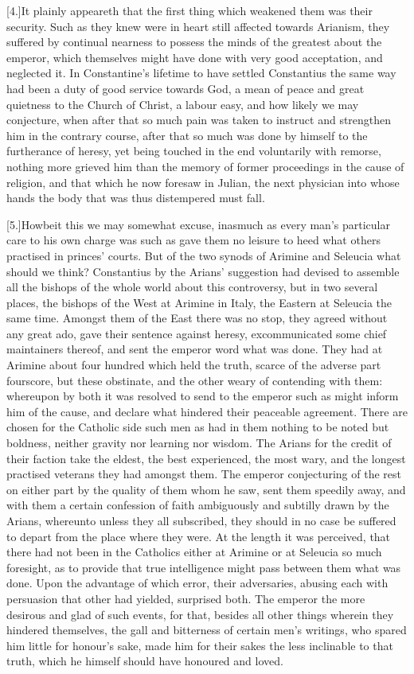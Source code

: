[4.]It plainly appeareth that the first thing which weakened them was their security. Such as they knew were in heart still affected towards Arianism, they suffered by continual nearness to possess the minds of the greatest about the emperor, which themselves might have done with very good acceptation, and neglected it. In Constantine’s lifetime to have settled Constantius the same way had been a duty of good service towards God, a mean of peace and great quietness to the Church of Christ, a labour easy, and how likely we may conjecture, when after that so much pain was taken to instruct and strengthen him in the contrary course, after that so much was done by himself to the furtherance of heresy, yet being touched in the end voluntarily with remorse, nothing more grieved him than the memory of former proceedings in the cause of religion, and that which he now foresaw in Julian, the next physician into whose hands the body that was thus distempered must fall.

[5.]Howbeit this we may somewhat excuse, inasmuch as every man’s particular care to his own charge was such as gave them no leisure to heed what others practised in princes’ courts. But of the two synods of Arimine and Seleucia what should we think? Constantius by the Arians’ suggestion had devised to assemble all the bishops of the whole world about this controversy, but in two several places, the bishops of the  West at Arimine in Italy, the Eastern at Seleucia the same time.
 Amongst them of the East there was no stop, they agreed without any great ado, gave their sentence against heresy, excommunicated some chief maintainers thereof, and sent the emperor word what was done. They had at Arimine about four hundred which held the truth, scarce of the adverse part fourscore, but these obstinate, and the other weary of contending with them: whereupon by both it was resolved to send to the emperor such as might inform him of the cause, and declare what hindered their peaceable agreement. There are chosen for the Catholic side such men as had in them nothing to be noted but boldness, neither gravity nor learning nor wisdom. The Arians for the credit of their faction take the eldest, the best experienced, the most wary, and the longest practised veterans they had amongst them. The emperor conjecturing of the rest on either part by the quality of them whom he saw, sent them speedily away, and with them a certain confession of faith ambiguously and subtilly drawn by the Arians, whereunto unless they all subscribed, they should in no case be suffered to depart from the place where they were. At the length it was perceived, that there had not been in the Catholics either at Arimine or at Seleucia so much foresight, as to provide that true intelligence might pass between them what was done. Upon the advantage of which error, their adversaries, abusing each with persuasion that other had yielded, surprised both. The emperor the more desirous and glad of such events, for that, besides all other things wherein they hindered themselves, the gall and bitterness of certain men’s writings, who spared him little for honour’s sake, made him for their sakes the less inclinable to that truth, which he himself should have honoured and loved.

